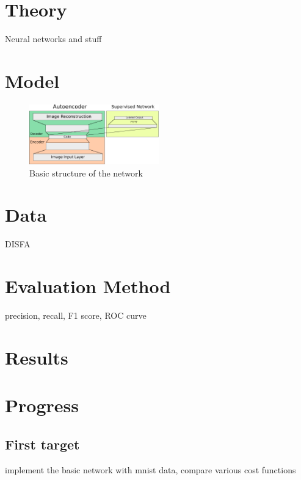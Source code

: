 \documentclass[11pt]{article}
\begin{document}
\section{Theory}
Neural networks and stuff\cite{jaiswal_deep_2016}
\section{Model}
\begin{figure}
  \begin{center}
    \includegraphics[width=0.5\textwidth]{illustrations/network_01.pdf}
  \end{center}
  \caption{Basic structure of the network}
\end{figure}
\section{Data}
DISFA
\section{Evaluation Method}
precision, recall, F1 score, ROC curve
\section{Results}
\section{Progress}
\subsection{First target}
implement the basic network with mnist data, compare various cost functions



\end{document}
